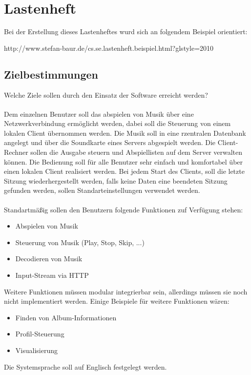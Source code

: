 \chapter{Lastenheft}
Bei der Erstellung dieses Lastenheftes wurd sich an folgendem Beispiel orientiert:
\begin{center}
http://www.stefan-baur.de/cs.se.lastenheft.beispiel.html?glstyle=2010
\end{center}
\section{Zielbestimmungen}
Welche Ziele sollen durch den Einsatz der Software erreicht werden?\ \\ \\
Dem einzelnen Benutzer soll das abspielen von Musik über eine Netzwerkverbindung ermöglicht
werden, dabei soll die Steuerung von einem lokalen Client übernommen werden. Die Musik soll
in eine rzentralen Datenbank angelegt und über die Soundkarte eines Servers abgespielt werden.
Die Client-Rechner sollen die Ausgabe steuern und Abspiellisten auf dem Server verwalten
können. Die Bedienung soll für alle Benutzer sehr einfach und komfortabel über einen lokalen
Client realisiert werden. Bei jedem Start des Clients, soll die letzte Sitzung wiederhergestellt
werden, falls keine Daten eine beendeten Sitzung gefunden werden, sollen Standarteinstellungen
verwendet werden.\ \\ \\
Standartmäßig sollen den Benutzern folgende Funktionen zuf Verfügung stehen:
\renewcommand{\labelitemi}{•}
\begin{itemize}
        \item Abspielen von Musik
        \item Steuerung von Musik (Play, Stop, Skip, ...)
        \item Decodieren von Musik
        \item Input-Stream via HTTP
\end{itemize}
Weitere Funktionen müssen modular integrierbar sein, allerdings müssen sie noch nicht implementiert
werden. Einige Beispiele für weitere Funktionen wären:
\begin{itemize}
	\item Finden von Album-Informationen
	\item Profil-Steuerung
	\item Visualisierung
\end{itemize}
Die Systemsprache soll auf Englisch festgelegt werden.

